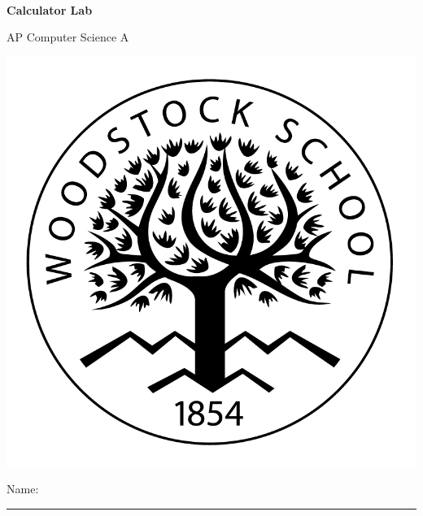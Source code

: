 
\usepackage[utf8]{inputenc}

\def\LabCourse{AP Computer Science A}
\def\LabNumber{05}
\def\LabTitle{Calculator Lab}

\newcommand\QBlankBox[1]{
\stepcounter{QuestionCounter}
	\colorbox{black!10}{\parbox{0.9875\textwidth}{
	  \raggedright
	  \textbf{Question \#\theQuestionCounter:} #1
	}}
}

\newcommand\QFilledBox[2]{
\stepcounter{QuestionCounter}
	\colorbox{black!10}{\parbox{0.9875\textwidth}{
	  \raggedright
	  \textbf{Question \#\theQuestionCounter:} #1
	}}

	\colorbox{black!5}{\parbox{0.9875\textwidth}{
		\raggedright
		#2
	}}
}


	\begin{coverpages}
		\ \\[2cm]
		\begin{center}
			\huge
			\textbf{\LabTitle}

			\Large
			\LabCourse
		\end{center}

		\vspace{1.5cm}

		\begin{center}
			\includegraphics[scale=0.45]{graphics/logo_black}

			\vspace{2.5cm}

			\Large
			Name: \rule{11.5cm}{0.1pt}
		\end{center}
	\end{coverpages}

